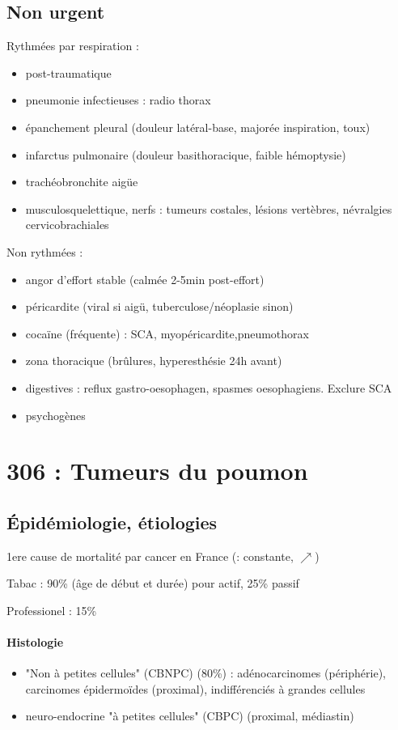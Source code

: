 \documentclass{article}
\begin{document}
\subsection{Non urgent}
Rythmées par respiration :
\begin{itemize}
\item post-traumatique
\item pneumonie infectieuses : radio thorax
\item épanchement pleural (douleur latéral-base, majorée inspiration, toux)
\item infarctus pulmonaire (douleur basithoracique, faible hémoptysie)
\item trachéobronchite aigüe
\item musculosquelettique, nerfs : tumeurs costales, lésions vertèbres,
  névralgies cervicobrachiales
\end{itemize}
Non rythmées :
\begin{itemize}
\item angor d'effort stable (calmée 2-5min post-effort)
\item péricardite (viral si aigü, tuberculose/néoplasie sinon)
\item cocaïne (fréquente) : SCA, myopéricardite,pneumothorax
\item zona thoracique (brûlures, hyperesthésie 24h avant)
\item digestives : reflux gastro-oesophagen, spasmes oesophagiens. Exclure SCA
  \skull
\item psychogènes
\end{itemize}

\section{306 : Tumeurs du poumon}%
\label{sec:306_tumeurs_du_poumon}

\subsection{Épidémiologie, étiologies}
1ere cause de mortalité par cancer en France (\male : constante, \female
$\nearrow$)

Tabac : 90\% (âge de début et durée) pour actif, 25\% passif

Professionel : 15\%

\paragraph{Histologie}
\begin{itemize}
\item "Non à petites cellules" (CBNPC) (80\%) : adénocarcinomes (périphérie),
  carcinomes épidermoïdes (proximal), indifférenciés à grandes cellules
\item neuro-endocrine "à petites cellules" (CBPC) (proximal, médiastin)
\end{itemize}
\end{document}
